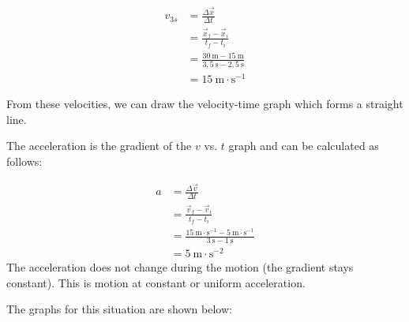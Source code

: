    \begin{align*}
    {v}_{3s}&= \frac{\Delta \vec{x}}{\Delta t}\\ 
    &= \frac{\vec{x}_{f}-\vec{x}_{i}}{{t}_{f}-{t}_{i}}\\ 
    &= \frac{30~\text{m}-15~\text{m}}{3,5~\text{s}-2,5~\text{s}}\\ 
    &= 15~\text{m}\ensuremath{\cdot}{\text{s}}^{-1}
      \end{align*}
        \par 
        \label{m38795*id72478}From these velocities, we can draw the velocity-time graph which forms a straight line.\par 
        \label{m38795*id72482}The acceleration is the gradient of the $v$ vs. $t$ graph and can be calculated as follows:\par 
        \label{m38795*id72504}\nopagebreak\noindent{}
          
    \begin{align*}
    a&= \frac{\Delta \vec{v}}{\Delta t} \\ 
    &= \frac{\vec{v}_{f}-\vec{v}_{i}}{{t}_{f}-{t}_{i}}\\ 
    &= \frac{15~\text{m}\ensuremath{\cdot}{\text{s}}^{-1}-5~\text{m}\ensuremath{\cdot}{\text{s}}^{-1}}{3~\text{s}-1~\text{s}}\\ 
    &= 5~\text{m}\ensuremath{\cdot}{\text{s}}^{-2}
      \end{align*}
        \label{m38795*id72716}The acceleration does not change during the motion (the gradient stays constant). This is motion at constant or uniform acceleration.\par 
        \label{m38795*id72723}The graphs for this situation are shown below:
    
